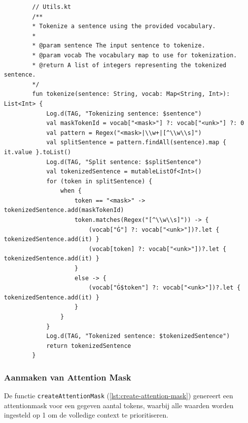\begin{listing}
    \begin{verbatim}
        // Utils.kt
        /**
        * Tokenize a sentence using the provided vocabulary.
        *
        * @param sentence The input sentence to tokenize.
        * @param vocab The vocabulary map to use for tokenization.
        * @return A list of integers representing the tokenized sentence.
        */
        fun tokenize(sentence: String, vocab: Map<String, Int>): List<Int> {
            Log.d(TAG, "Tokenizing sentence: $sentence")
            val maskTokenId = vocab["<mask>"] ?: vocab["<unk>"] ?: 0
            val pattern = Regex("<mask>|\\w+|[^\\w\\s]")
            val splitSentence = pattern.findAll(sentence).map { it.value }.toList()
            Log.d(TAG, "Split sentence: $splitSentence")
            val tokenizedSentence = mutableListOf<Int>()
            for (token in splitSentence) {
                when {
                    token == "<mask>" -> tokenizedSentence.add(maskTokenId)
                    token.matches(Regex("[^\\w\\s]")) -> {
                        (vocab["Ġ"] ?: vocab["<unk>"])?.let { tokenizedSentence.add(it) }
                        (vocab[token] ?: vocab["<unk>"])?.let { tokenizedSentence.add(it) }
                    }
                    else -> {
                        (vocab["Ġ$token"] ?: vocab["<unk>"])?.let { tokenizedSentence.add(it) }
                    }
                }
            }
            Log.d(TAG, "Tokenized sentence: $tokenizedSentence")
            return tokenizedSentence
        }
    \end{verbatim}
    \caption[\texttt{tokenize}]{De \texttt{tokenize} functie zet een zin om in een lijst van tokens op basis van het opgegeven vocabulaire.}
    \label{lst:tokenize}
\end{listing}

\subsubsection{Aanmaken van Attention Mask}

De functie \texttt{createAttentionMask} (\ref{lst:create-attention-mask}) genereert een \gls{attentionmask} voor een gegeven aantal tokens, waarbij alle waarden worden ingesteld op 1 om de volledige context te prioritiseren.

